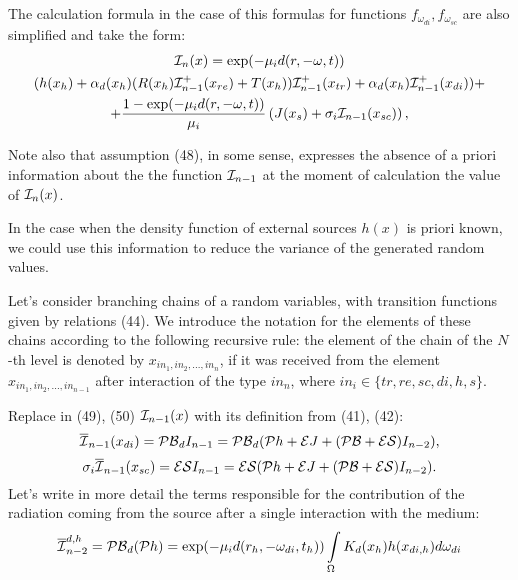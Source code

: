 \documentclass[12pt,reqno]{report}
\begin{document}
The calculation formula in the case of this formulas for functions $f_{\omega_{di}}, f_{\omega_{sc}}$
are also simplified and take the form:
 \begin{multline}
{\cal I}_n(x) = \exp(-\mu_i d(r, -\omega, t)) 
\\ (h(x_h) +  \alpha_d(x_h)(R(x_h) {\cal I}_{n-1}^+
(x_{re}) + T(x_h) ) {\cal I}_{n-1}^+ (x_{tr}) + \alpha_d(x_h) {\cal I}_{n-1}^+ (x_{di})) +
\\ + \frac{1 - \exp(-\mu_i d(r, -\omega, t))}{\mu_i} \left(J(x_s) + \sigma_i {\cal I}_{n-1}(x_{sc})\right),
\end{multline}
{Note also that assumption (48), in some sense,
expresses the absence of a priori information about the the function ${\cal I}_{n-1} $
at the moment of calculation the value of $ {\cal I}_n(x) $.

In the case when the density function of external sources $h(x)$ is priori known,
we could use this information to reduce the variance of the generated random values.

Let's consider branching chains of a random variables, with transition functions given by relations (44).
We introduce the notation for the elements of these chains according to the following recursive rule:
the element of the chain of the $N$-th level is denoted by $x_{in_1, in_2, ..., in_n}$,
if it was received from the element $x_{in_1, in_2, ..., in_{n-1}}$ after interaction of the type $in_n$,
where $in_i \in \{tr, re, sc, di, h, s\}$.

Replace in (49), (50) ${\cal I}_{n-1}(x)$ with its definition from (41), (42):
\begin{equation}
{\overline{\cal I}_{n-1}(x_{di})} = 
{\cal PB}_{d} I_{n-1} = {\cal PB}_{d} (\mathcal{P} h + \mathcal E J + (\mathcal{PB} + \mathcal{ES}) I_{n-2}),
\end{equation}
\begin{equation}
{\sigma_i \overline{\cal I}_{n-1}(x_{sc})} = {\cal ES}I_{n-1} = 
{\cal ES} (\mathcal{P} h + \mathcal E J + (\mathcal{PB} + \mathcal{ES}) I_{n-2}).
\end{equation}
Let's write in more detail the terms responsible for the contribution of the radiation coming from the source after a single interaction with the medium:
\begin{equation}
{\overline{\cal I}_{n-2}^{d, h}} = {\cal PB}_{d} (\mathcal{P} h) =
\exp(- \mu_i d(r_h, -\omega_{di}, t_h))  \int\limits_{\Omega} K_d(x_h) h(x_{di, h})d\omega_{di}
\end{equation}

}
\end{document}
